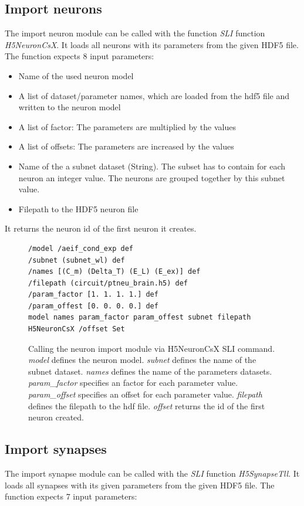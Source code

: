 \subsection{Import neurons}
The import neuron module can be called with the function \emph{SLI} function  \emph{H5NeuronCsX}. It loads all neurons with its parameters
from the given HDF5 file. The function expects $8$ input parameters:
\begin{itemize}
      \item Name of the used neuron model
      \item A list of dataset/parameter names, which are loaded from the hdf5 file and written to the neuron model
      \item A list of factor: The parameters are multiplied by the values
      \item A list of offsets: The parameters are increased by the values
      \item Name of the a subnet dataset (String).
The subset has to contain for each neuron an integer value.
The neurons are grouped together by this subnet value.
      \item Filepath to the HDF5 neuron file
\end{itemize}
It returns the neuron id of the first neuron it creates.
\begin{figure}[ht!]
\begin{lstlisting}[]
/model /aeif_cond_exp def
/subnet (subnet_wl) def
/names [(C_m) (Delta_T) (E_L) (E_ex)] def
/filepath (circuit/ptneu_brain.h5) def
/param_factor [1. 1. 1. 1.] def
/param_offest [0. 0. 0. 0.] def
model names param_factor param_offest subnet filepath H5NeuronCsX /offset Set

\end{lstlisting}
\caption[Calling the neuron import module via H5NeuronCsX SLI command]{Calling the neuron import module via H5NeuronCsX SLI command.
\emph{model} defines the neuron model.
\emph{subnet} defines the name of the subnet dataset.
\emph{names} defines the name of the parameters datasets.
\emph{param\_factor} specifies an factor for each parameter value.
\emph{param\_offset} specifies an offset for each parameter value.
\emph{filepath} defines the filepath to the hdf file.
\emph{offset} returns the id of the first neuron created.}
\end{figure}

\subsection{Import synapses}
The import synapse module can be called with the \emph{SLI} function  \emph{H5SynapseTll}. It loads all synapses with its given parameters
from the given HDF5 file. The function expects 7 input parameters:
 
